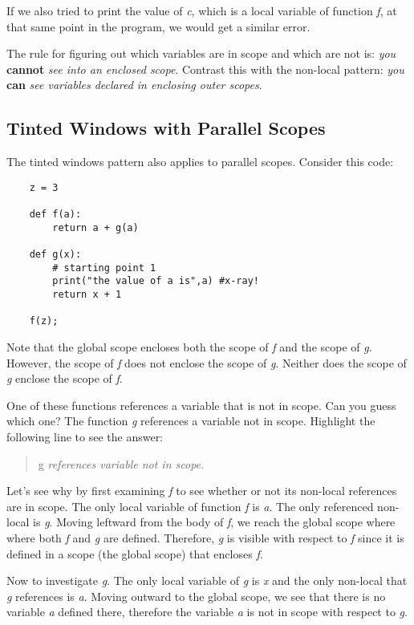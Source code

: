 If we also tried to print the value of {\it c},
which is a local variable of function {\it f}, at that
same point in the program, we would get a similar error.

The rule for figuring out which variables are in scope and
which are not is:
{\it you} {\bf cannot} {\it see into an enclosed scope}.
Contrast this with the non-local pattern:
{\it you} {\bf can} {\it see variables
declared in enclosing outer scopes}.

\subsection{Tinted Windows with Parallel Scopes}

The tinted windows pattern also applies to parallel scopes.
Consider this code:

\begin{verbatim}
    z = 3

    def f(a):
        return a + g(a)

    def g(x):
        # starting point 1
        print("the value of a is",a) #x-ray!
        return x + 1

    f(z);
\end{verbatim}

Note that the global scope encloses both the scope of {\it f} and
the scope of {\it g}. However, the scope of {\it f} does
not enclose the scope of {\it g}. Neither does
the scope of {\it g} enclose the scope of {\it f}.

One of these functions references a variable that is not in scope.
Can you guess which one?
\T The function {\it g} references a  variable not in scope.
\W Highlight the following line to see the answer:

\W\begin{quote}
 {\color{white} g} {\it references variable not in scope.}
\W\end{quote}

Let's see why by first examining {\it f} to see whether or
not its non-local references are in scope.
The only local variable of function {\it f} is
{\it a}. The only referenced non-local is {\it g}.
Moving leftward from the body of {\it f}, we reach the
global scope where where both {\it f} and {\it g} are defined.
Therefore, {\it g}
is visible with respect to {\it f} since it is defined in a scope
(the global scope) that encloses {\it f}.

Now to investigate {\it g}. The only local variable of
{\it g} is {\it x}
and the only non-local that {\it g} references is {\it a}.
Moving outward to the global scope, we see that there is
no variable {\it a} defined there,
therefore the variable {\it a} is not in scope with
respect to {\it g}.

